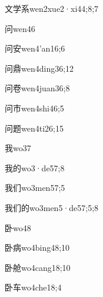 \begin{verbete}{文学系}{wen2xue2·xi4}{4;8;7}
\end{verbete}
\begin{verbete}{问}{wen4}{6}
\end{verbete}
\begin{verbete}{问安}{wen4'an1}{6;6}
\end{verbete}
\begin{verbete}{问鼎}{wen4ding3}{6;12}
\end{verbete}
\begin{verbete}{问卷}{wen4juan3}{6;8}
\end{verbete}
\begin{verbete}{问市}{wen4shi4}{6;5}
\end{verbete}
\begin{verbete}{问题}{wen4ti2}{6;15}
\end{verbete}
\begin{verbete}{我}{wo3}{7}
\end{verbete}
\begin{verbete}{我的}{wo3·de5}{7;8}
\end{verbete}
\begin{verbete}{我们}{wo3men5}{7;5}
\end{verbete}
\begin{verbete}{我们的}{wo3men5·de5}{7;5;8}
\end{verbete}
\begin{verbete}{卧}{wo4}{8}
\end{verbete}
\begin{verbete}{卧病}{wo4bing4}{8;10}
\end{verbete}
\begin{verbete}{卧舱}{wo4cang1}{8;10}
\end{verbete}
\begin{verbete}{卧车}{wo4che1}{8;4}
\end{verbete}
